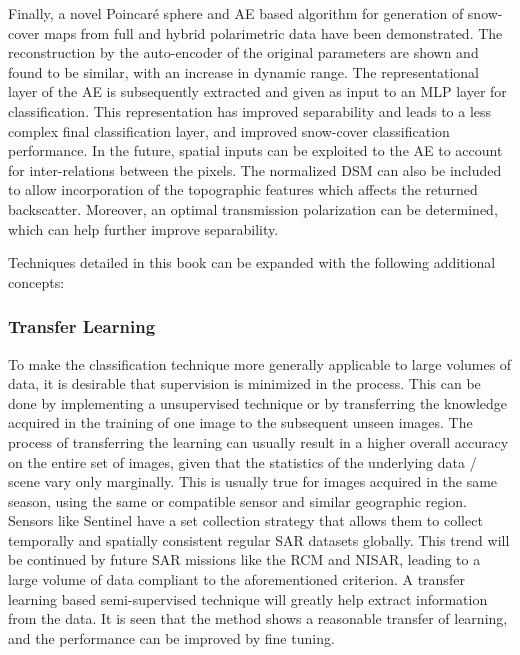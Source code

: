 Finally, a novel Poincar\'e sphere and AE based algorithm for generation of snow-cover maps from full and hybrid polarimetric data have been demonstrated. The reconstruction by the auto-encoder of the original parameters are shown and found to be similar, with an increase in dynamic range. The representational layer of the AE is subsequently extracted and given as input to an MLP layer for classification. This representation has improved separability and leads to a less complex final classification layer, and improved snow-cover classification performance. 
In the future, spatial inputs can be exploited to the AE to account for inter-relations between the pixels. The normalized DSM can also be included to allow incorporation of the topographic features which affects the returned backscatter. 
Moreover, an optimal transmission polarization can be determined, which can help further improve separability. 

Techniques detailed in this book can be expanded with the following additional concepts:

\subsubsection*{Transfer Learning}
To make the classification technique more generally applicable to large volumes of data, it is desirable that supervision is minimized in the process. This can be done by implementing a unsupervised technique or by transferring the knowledge acquired in the training of one image to the subsequent unseen images. The process of transferring the learning can usually result in a higher overall accuracy on the entire set of images, given that the statistics of the underlying data / scene vary only marginally. This is usually true for images acquired in the same season, using the same or compatible sensor and similar geographic region. Sensors like Sentinel have a set collection strategy that allows them to collect temporally and spatially consistent regular SAR datasets globally. This trend will be continued by future SAR missions like the RCM and NISAR, leading to a large volume of data compliant to the aforementioned criterion. A transfer learning based semi-supervised technique will greatly help extract information from the data. It is seen that the method shows a reasonable transfer of learning, and the performance can be improved by fine tuning.



